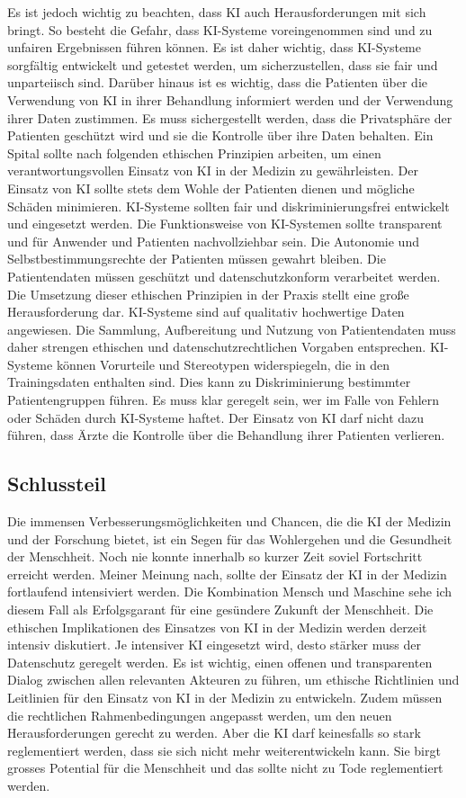 \documentclass{article}
\begin{document}
Es ist jedoch wichtig zu beachten, dass KI auch Herausforderungen mit sich bringt. So besteht die Gefahr, dass KI-Systeme voreingenommen sind und zu unfairen Ergebnissen führen können. Es ist daher wichtig, dass KI-Systeme sorgfältig entwickelt und getestet werden, um sicherzustellen, dass sie fair und unparteiisch sind.
Darüber hinaus ist es wichtig, dass die Patienten über die Verwendung von KI in ihrer Behandlung informiert werden und der Verwendung ihrer Daten zustimmen. Es muss sichergestellt werden, dass die Privatsphäre der Patienten geschützt wird und sie die Kontrolle über ihre Daten behalten.
Ein Spital sollte nach folgenden ethischen Prinzipien arbeiten, um einen verantwortungsvollen Einsatz von KI in der Medizin zu gewährleisten.
 Der Einsatz von KI sollte stets dem Wohle der Patienten dienen und mögliche Schäden minimieren. KI-Systeme sollten fair und diskriminierungsfrei entwickelt und eingesetzt werden. Die Funktionsweise von KI-Systemen sollte transparent und für Anwender und Patienten nachvollziehbar sein. Die Autonomie und Selbstbestimmungsrechte der Patienten müssen gewahrt bleiben. Die Patientendaten müssen geschützt und datenschutzkonform verarbeitet werden.
Die Umsetzung dieser ethischen Prinzipien in der Praxis stellt eine große Herausforderung dar. KI-Systeme sind auf qualitativ hochwertige Daten angewiesen. Die Sammlung, Aufbereitung und Nutzung von Patientendaten muss daher strengen ethischen und datenschutzrechtlichen Vorgaben entsprechen.
 KI-Systeme können Vorurteile und Stereotypen widerspiegeln, die in den Trainingsdaten enthalten sind. Dies kann zu Diskriminierung bestimmter Patientengruppen führen.
Es muss klar geregelt sein, wer im Falle von Fehlern oder Schäden durch KI-Systeme haftet.
Der Einsatz von KI darf nicht dazu führen, dass Ärzte die Kontrolle über die Behandlung ihrer Patienten verlieren.

\subsection{Schlussteil}
Die immensen Verbesserungsmöglichkeiten und Chancen, die die KI der Medizin und der Forschung bietet, ist ein Segen für das Wohlergehen und die Gesundheit der Menschheit. Noch nie konnte innerhalb so kurzer Zeit soviel Fortschritt erreicht werden. Meiner Meinung nach, sollte der Einsatz der KI in der Medizin fortlaufend intensiviert werden. Die Kombination Mensch und Maschine sehe ich diesem Fall als Erfolgsgarant für eine gesündere Zukunft der Menschheit.
Die ethischen Implikationen des Einsatzes von KI in der Medizin werden derzeit intensiv diskutiert. Je intensiver KI eingesetzt wird, desto stärker muss der Datenschutz geregelt werden. Es ist wichtig, einen offenen und transparenten Dialog zwischen allen relevanten Akteuren zu führen, um ethische Richtlinien und Leitlinien für den Einsatz von KI in der Medizin zu entwickeln. Zudem müssen die rechtlichen Rahmenbedingungen angepasst werden, um den neuen Herausforderungen gerecht zu werden. Aber die KI darf keinesfalls so stark reglementiert werden, dass sie sich nicht mehr weiterentwickeln kann. Sie birgt grosses Potential für die Menschheit und das sollte nicht zu Tode reglementiert werden.



\nocite{*}


\printbibliography
\end{document}
